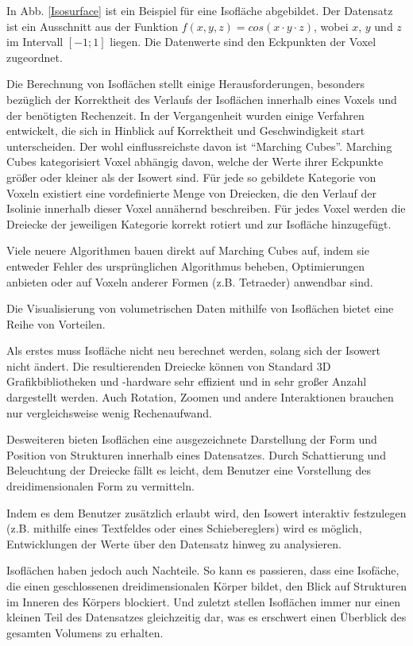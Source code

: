 \documentclass[a4paper,fontsize=12pt,toc=bib,halfparskip]{scrartcl}
\begin{document}
In Abb. \ref{Isosurface} ist ein Beispiel f\"ur eine Isofl\"ache abgebildet. Der Datensatz ist ein Ausschnitt aus der Funktion $f(x,y,z) = cos(x \cdot y \cdot z)$, wobei $x$, $y$ und $z$ im Intervall $[-1;1]$ liegen. Die Datenwerte sind den Eckpunkten der Voxel zugeordnet. 

Die Berechnung von Isofl\"achen stellt einige Herausforderungen, besonders bez\"uglich der Korrektheit des Verlaufs der Isofl\"achen innerhalb eines Voxels und der ben\"otigten Rechenzeit. In der Vergangenheit wurden einige Verfahren entwickelt, die sich in Hinblick auf Korrektheit und Geschwindigkeit start unterscheiden. Der wohl einflussreichste davon ist ``Marching Cubes''. Marching Cubes kategorisiert Voxel abh\"angig davon, welche der Werte ihrer Eckpunkte gr\"o{\ss}er oder kleiner als der Isowert sind. F\"ur jede so gebildete Kategorie von Voxeln existiert eine vordefinierte Menge von Dreiecken, die den Verlauf der Isolinie innerhalb dieser Voxel ann\"ahernd beschreiben. F\"ur jedes Voxel werden die Dreiecke der jeweiligen Kategorie korrekt rotiert und zur Isofl\"ache hinzugef\"ugt.

Viele neuere Algorithmen bauen direkt auf Marching Cubes auf, indem sie entweder Fehler des urspr\"unglichen Algorithmus beheben, Optimierungen anbieten oder auf Voxeln anderer Formen (z.B. Tetraeder) anwendbar sind.

Die Visualisierung von volumetrischen Daten mithilfe von Isofl\"achen bietet eine Reihe von Vorteilen. 

Als erstes muss Isofl\"ache nicht neu berechnet werden, solang sich der Isowert nicht \"andert. Die resultierenden Dreiecke k\"onnen von Standard 3D Grafikbibliotheken und -hardware sehr effizient und in sehr gro{\ss}er Anzahl dargestellt werden. Auch Rotation, Zoomen und andere Interaktionen brauchen nur vergleichsweise wenig Rechenaufwand.

Desweiteren bieten Isofl\"achen eine ausgezeichnete Darstellung der Form und Position von Strukturen innerhalb eines Datensatzes. Durch Schattierung und Beleuchtung der Dreiecke f\"allt es leicht, dem Benutzer eine Vorstellung des dreidimensionalen Form zu vermitteln.

Indem es dem Benutzer zus\"atzlich erlaubt wird, den Isowert interaktiv festzulegen (z.B. mithilfe eines Textfeldes oder eines Schiebereglers) wird es m\"oglich, Entwicklungen der Werte \"uber den Datensatz hinweg zu analysieren.

Isofl\"achen haben jedoch auch Nachteile. So kann es passieren, dass eine Isof\"ache, die einen geschlossenen dreidimensionalen K\"orper bildet, den Blick auf Strukturen im Inneren des K\"orpers blockiert. Und zuletzt stellen Isofl\"achen immer nur einen kleinen Teil des Datensatzes gleichzeitig dar, was es erschwert einen \"Uberblick des gesamten Volumens zu erhalten.
\end{document}
